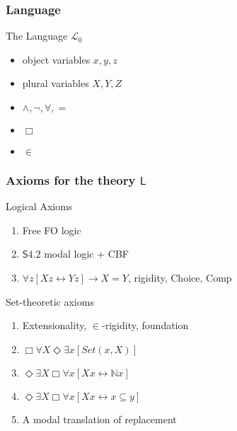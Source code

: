 \documentclass{beamer}
\begin{document}
\begin{frame}
    \frametitle{Language}
    \begin{block}{The Language $\mathcal{L}_0$}
        \begin{itemize}
            \item object variables $x, y, z$
            \item<2-> plural variables $X, Y, Z$
            \item<3-> $\wedge, \neg, \forall, =$
            \item<4-> $\Box$
            \item<5-> $\in$
        \end{itemize} 
    \end{block}
\end{frame}

\begin{frame}
    \frametitle{Axioms for the theory $\mathsf{L}$}
    \begin{block}{Logical Axioms}
    \begin{enumerate}
        \item<2-> Free FO logic
        \item<3-> $\mathsf{S4.2}$ modal logic + CBF
        \item<4-> $\forall z[Xz \leftrightarrow Yz] \rightarrow X = Y$, rigidity,
        Choice, Comp
    \end{enumerate}
    \end{block}
    \begin{block}{Set-theoretic axioms}
        \begin{enumerate}
        \item<6-> Extensionality, $\in$-rigidity, foundation
        \item<7-> $\Box \forall X \Diamond \exists x [Set(x, X)]$
        \item<8-> $\Diamond \exists X \Box \forall x[Xx \leftrightarrow \mathbb{N}x]$
        \item<9-> $\Diamond \exists X \Box \forall x[Xx \leftrightarrow x \subseteq y]$
        \item<10-> A modal translation of replacement
        \end{enumerate}
    \end{block}
\end{frame}
\end{document}
